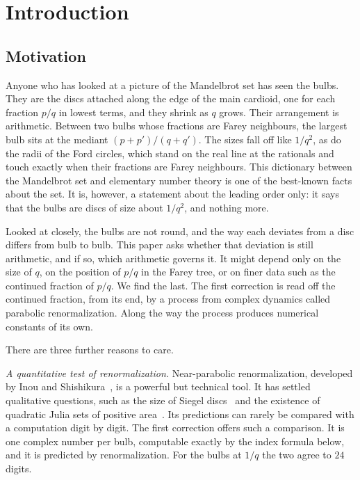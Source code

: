 \documentclass[11pt]{amsart}
\theoremstyle{definition}
\theoremstyle{remark}
\begin{document}
\maketitle

\section{Introduction}\label{sec:intro}

\subsection{Motivation}\label{sec:motivation}
Anyone who has looked at a picture of the Mandelbrot set has seen the bulbs. They are the discs attached along the edge of the main cardioid, one for each fraction $p/q$ in lowest terms, and they shrink as $q$ grows. Their arrangement is arithmetic. Between two bulbs whose fractions are Farey neighbours, the largest bulb sits at the mediant $(p+p')/(q+q')$. The sizes fall off like $1/q^2$, as do the radii of the Ford circles, which stand on the real line at the rationals and touch exactly when their fractions are Farey neighbours. This dictionary between the Mandelbrot set and elementary number theory is one of the best-known facts about the set. It is, however, a statement about the leading order only: it says that the bulbs are discs of size about $1/q^2$, and nothing more.

Looked at closely, the bulbs are not round, and the way each deviates from a disc differs from bulb to bulb. This paper asks whether that deviation is still arithmetic, and if so, which arithmetic governs it. It might depend only on the size of $q$, on the position of $p/q$ in the Farey tree, or on finer data such as the continued fraction of $p/q$. We find the last. The first correction is read off the continued fraction, from its end, by a process from complex dynamics called parabolic renormalization. Along the way the process produces numerical constants of its own.

There are three further reasons to care.

\emph{A quantitative test of renormalization.} Near-parabolic renormalization, developed by Inou and Shishikura~\cite{IS}, is a powerful but technical tool. It has settled qualitative questions, such as the size of Siegel discs~\cite{BuffCheritat} and the existence of quadratic Julia sets of positive area~\cite{BC12}. Its predictions can rarely be compared with a computation digit by digit. The first correction offers such a comparison. It is one complex number per bulb, computable exactly by the index formula below, and it is predicted by renormalization. For the bulbs at $1/q$ the two agree to $24$ digits.
\end{document}
